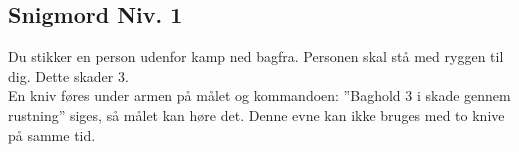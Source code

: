 \subsection*{Snigmord Niv. 1}
Du stikker en person udenfor kamp ned bagfra. Personen skal stå med ryggen til dig. Dette skader 3.\\ 
En kniv føres under armen på målet og kommandoen: ”Baghold 3 i skade gennem rustning” siges, så målet kan høre det. Denne evne kan ikke bruges med to knive på samme tid.\\